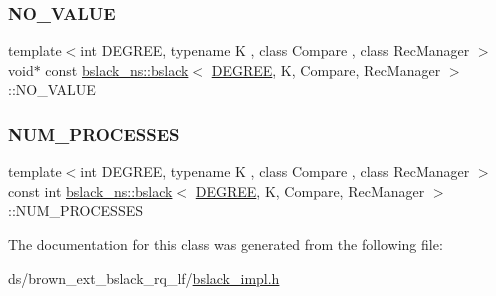 \subsubsection{\texorpdfstring{N\+O\+\_\+\+V\+A\+L\+UE}{NO\_VALUE}}
{\footnotesize\ttfamily template$<$int D\+E\+G\+R\+EE, typename K , class Compare , class Rec\+Manager $>$ \\
void$\ast$ const \hyperlink{classbslack__ns_1_1bslack}{bslack\+\_\+ns\+::bslack}$<$ \hyperlink{brown__sigouin__abtree__kcas_2adapter_8h_a5d88b17d70c985f2f2b8e987037fd6dd}{D\+E\+G\+R\+EE}, K, Compare, Rec\+Manager $>$\+::N\+O\+\_\+\+V\+A\+L\+UE}

\mbox{\label{classbslack__ns_1_1bslack_ab6c3d7c3c21780189d88f79cddaeee00}} 
\subsubsection{\texorpdfstring{N\+U\+M\+\_\+\+P\+R\+O\+C\+E\+S\+S\+ES}{NUM\_PROCESSES}}
{\footnotesize\ttfamily template$<$int D\+E\+G\+R\+EE, typename K , class Compare , class Rec\+Manager $>$ \\
const int \hyperlink{classbslack__ns_1_1bslack}{bslack\+\_\+ns\+::bslack}$<$ \hyperlink{brown__sigouin__abtree__kcas_2adapter_8h_a5d88b17d70c985f2f2b8e987037fd6dd}{D\+E\+G\+R\+EE}, K, Compare, Rec\+Manager $>$\+::N\+U\+M\+\_\+\+P\+R\+O\+C\+E\+S\+S\+ES}



The documentation for this class was generated from the following file\+:\begin{DoxyCompactItemize}
\item 
ds/brown\+\_\+ext\+\_\+bslack\+\_\+rq\+\_\+lf/\hyperlink{bslack__impl_8h}{bslack\+\_\+impl.\+h}\end{DoxyCompactItemize}
